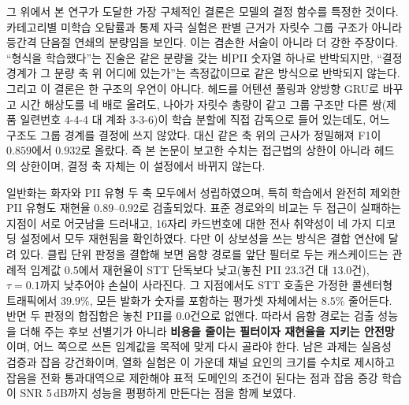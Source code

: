 \documentclass[10pt,twocolumn]{article}
\renewcommand{\emph}[1]{\textbf{#1}}
\begin{document}
그 위에서 본 연구가 도달한 가장 구체적인 결론은 모델의 결정 함수를 특정한 것이다. 카테고리별
미학습 오탐률과 통제 자극 실험은 판별 근거가 자릿수 그룹 구조가 아니라 등간격 단음절 연쇄의
분량임을 보인다. 이는 겸손한 서술이 아니라 더 강한 주장이다. ``형식을 학습했다''는 진술은 같은
분량을 갖는 비PII 숫자열 하나로 반박되지만, ``결정 경계가 그 분량 축 위 어디에 있는가''는
측정값이므로 같은 방식으로 반박되지 않는다. 그리고 이 결론은 한 구조의 우연이 아니다. 헤드를 어텐션 풀링과 양방향 GRU로 바꾸고 시간
해상도를 네 배로 올려도, 나아가 자릿수 총량이 같고 그룹 구조만 다른 쌍(제품 일련번호 4-4-4 대
계좌 3-3-6)이 학습 분할에 직접 감독으로 들어 있는데도, 어느 구조도 그룹 경계를 결정에 쓰지
않았다. 대신 같은 축 위의 근사가 정밀해져 F1이 $0.859$에서 $0.932$로 올랐다. 즉 본 논문이 보고한
수치는 접근법의 상한이 아니라 헤드의 상한이며, 결정 축 자체는 이 설정에서 바뀌지 않는다.

일반화는 화자와 PII 유형 두 축 모두에서 성립하였으며, 특히 학습에서 완전히 제외한 PII 유형도
재현율 $0.89$--$0.92$로 검출되었다. 표준 경로와의 비교는 두 접근이 실패하는 지점이 서로 어긋남을
드러내고, 16자리 카드번호에 대한 전사 취약성이 네 가지 디코딩 설정에서 모두 재현됨을 확인하였다.
다만 이 상보성을 쓰는 방식은 결합 연산에 달려 있다. 클립 단위 판정을 결합해 보면 음향 경로를
앞단 필터로 두는 캐스케이드는 관례적 임계값 $0.5$에서 재현율이 STT 단독보다 낮고(놓친 PII
$23.3$건 대 $13.0$건), $\tau=0.1$까지 낮추어야 손실이 사라진다. 그 지점에서도 STT 호출은 가정한 콜센터형 트래픽에서
$39.9\%$, 모든 발화가 숫자를 포함하는 평가셋 자체에서는 $8.5\%$ 줄어든다. 반면 두 판정의 합집합은 놓친 PII를 $0.0$건으로 없앤다. 따라서 음향 경로는
검출 성능을 더해 주는 후보 선별기가 아니라 \emph{비용을 줄이는 필터이자 재현율을 지키는
안전망}이며, 어느 쪽으로 쓰든 임계값을 목적에 맞게 다시 골라야 한다. 남은 과제는 실음성 검증과 잡음 강건화이며, 열화 실험은 이 가운데 채널 요인의 크기를
수치로 제시하고 잡음을 전화 통과대역으로 제한해야 표적 도메인의 조건이 된다는 점과 잡음 증강
학습이 SNR 5\,dB까지 성능을 평평하게 만든다는 점을 함께 보였다.



\end{document}
